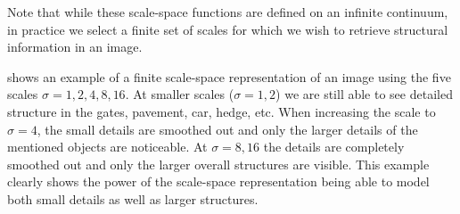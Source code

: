\documentclass[thesis.tex]{subfiles}
\begin{document}
Note that while these scale-space functions are defined on an infinite continuum, in practice we select a finite set of scales for which we wish to retrieve structural information in an image.

 shows an example of a finite scale-space representation of an image using the five scales $\sigma = 1,2,4,8,16$. At smaller scales ($\sigma = 1,2$) we are still able to see detailed structure in the gates, pavement, car, hedge, etc. When increasing the scale to $\sigma = 4$, the small details are smoothed out and only the larger details of the mentioned objects are noticeable. At $\sigma = 8, 16$ the details are completely smoothed out and only the larger overall structures are visible. This example clearly shows the power of the scale-space representation being able to model both small details as well as larger structures.
%
\end{document}
